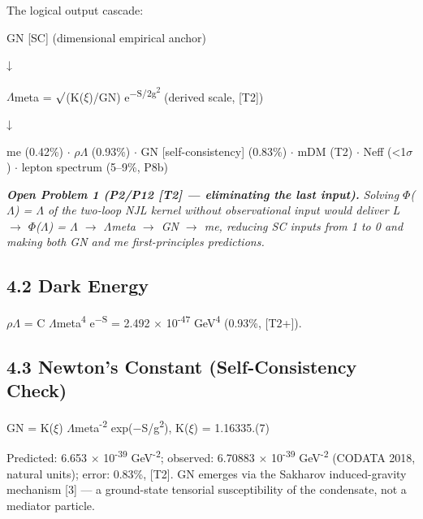 \documentclass[11pt,letterpaper]{article}
\begin{document}
\noindent The logical output cascade:

\begingroup\centering GN [SC] (dimensional empirical anchor)\par\endgroup

\begingroup\centering ↓\par\endgroup

\begingroup\centering $\Lambda$meta = $\surd$(K($\xi$)/GN) e\textsuperscript{$-$S/2g\textsuperscript{2}}  (derived scale, [T2])\par\endgroup

\begingroup\centering ↓\par\endgroup

\begingroup\centering me (0.42\%) $\cdot$ $\rho$$\Lambda$ (0.93\%) $\cdot$ GN [self-consistency] (0.83\%) $\cdot$ mDM (T2) $\cdot$ Neff (<1$\sigma$) $\cdot$ lepton spectrum (5--9\%, P8b)\par\endgroup

\noindent \textbf{\textit{Open Problem 1 (P2/P12 [T2] --- eliminating the last input). }}\textit{Solving $\Phi$($\Lambda$) = $\Lambda$ of the two-loop NJL kernel without observational input would deliver L $\to$ $\Phi$($\Lambda$) = $\Lambda$ $\to$ $\Lambda$meta $\to$ GN $\to$ me, reducing SC inputs from 1 to 0 and making both GN and me first-principles predictions.}

\subsection*{4.2  Dark Energy}

\noindent $\rho$$\Lambda$ = C $\Lambda$meta\textsuperscript{4} e\textsuperscript{$-$S} = 2.492 $\times$ 10\textsuperscript{-47} GeV\textsuperscript{4} (0.93\%, [T2+]).

\subsection*{4.3  Newton's Constant (Self-Consistency Check)}

\begingroup\centering GN = K($\xi$) $\Lambda$meta\textsuperscript{-2} exp($-$S/g\textsuperscript{2}),   K($\xi$) = 1.16335.\hspace{2em}(7)\par\endgroup

\noindent Predicted: 6.653 $\times$ 10\textsuperscript{-39} GeV\textsuperscript{-2}; observed: 6.70883 $\times$ 10\textsuperscript{-39} GeV\textsuperscript{-2} (CODATA 2018, natural units); error: 0.83\%, [T2]. GN emerges via the Sakharov induced-gravity mechanism [3] --- a ground-state tensorial susceptibility of the condensate, not a mediator particle.
\end{document}
